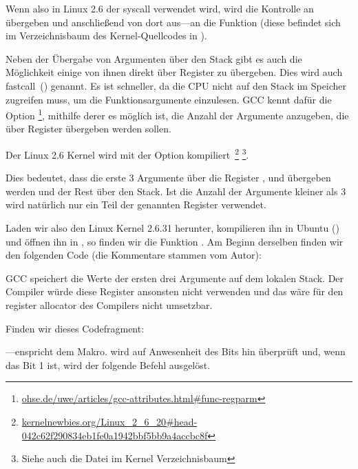 Wenn also in Linux 2.6 der syscall  verwendet wird, wird die
Kontrolle an  übergeben und anschließend von dort aus---an die
Funktion  (diese befindet sich im Verzeichnisbaum des
Kernel-Quellcodes in ).

\newcommand{\URLREGPARM}{\href{http://go.yurichev.com/17040}{ohse.de/uwe/articles/gcc-attributes.html\#func-regparm}}

\label{regparm}
Neben der Übergabe von Argumenten über den Stack gibt es auch die Möglichkeit
einige von ihnen direkt über Register zu übergeben. Dies wird auch
fastcall~() genannt. 
Es ist schneller, da die CPU nicht auf den Stack im Speicher zugreifen muss, um
die Funktionsargumente einzulesen.
GCC kennt dafür die Option \footnote{\URLREGPARM}, mithilfe derer es
möglich ist, die Anzahl der Argumente anzugeben, die über Register übergeben
werden sollen.

\newcommand{\URLKERNELNEWB}{\href{http://go.yurichev.com/17066}{kernelnewbies.org/Linux\_2\_6\_20\#head-042c62f290834eb1fe0a1942bbf5bb9a4accbc8f}}
\newcommand{\CALLINGHFILE}{arch/x86/include/asm/calling.h}

Der Linux 2.6 Kernel wird mit der Option 
kompiliert~\footnote{\URLKERNELNEWB} \footnote{Siehe auch die \TT{\CALLINGHFILE}
Datei im Kernel Verzeichnisbaum}.

Dies bedeutet, dass die erste 3 Argumente über die Register \EAX, \EDX und \ECX
übergeben werden und der Rest über den Stack. Ist die Anzahl der Argumente
kleiner als 3 wird natürlich nur ein Teil der genannten Register verwendet.

Laden wir also den Linux Kernel 2.6.31 herunter, kompilieren ihn in Ubuntu
() und öffnen ihn in \IDA, so finden wir die Funktion
. Am Beginn derselben finden wir den folgenden Code (die
Kommentare stammen vom Autor):


GCC speichert die Werte der ersten drei Argumente auf dem lokalen Stack.
Der Compiler würde diese Register ansonsten nicht verwenden und das wäre für den
\gls{register allocator} des Compilers nicht umsetzbar.

Finden wir dieses Codefragment:



---enspricht dem  Makro.
 wird auf Anwesenheit des  Bits hin überprüft und, wenn
das Bit 1 ist, wird der folgende \JNZ Befehl ausgelöst.
